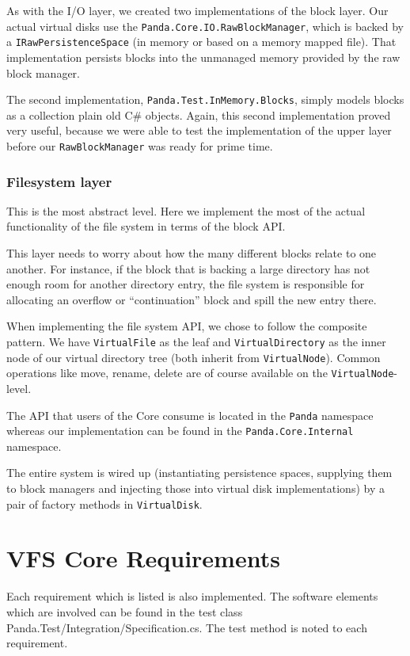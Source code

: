 \documentclass[a4paper,12pt]{article}
\begin{document}
As with the I/O layer, we created two implementations of the block layer.
Our actual virtual disks use the \texttt{Panda.Core.IO.RawBlockManager}, which is backed by a \texttt{IRawPersistenceSpace} (in memory or based on a memory mapped file).
That implementation persists blocks into the unmanaged memory provided by the raw block manager.

The second implementation, \texttt{Panda.Test.InMemory.Blocks}, simply models blocks as a collection plain old C\# objects.
Again, this second implementation proved very useful, because we were able to test the implementation of the upper layer before our \texttt{RawBlockManager} was ready for prime time.

\subsubsection{Filesystem layer}

This is the most abstract level. 
Here we implement the most of the actual functionality of the file system in terms of the block API.

This layer needs to worry about how the many different blocks relate to one another.
For instance, if the block that is backing a large directory has not enough room for another directory entry, the file system is responsible for allocating an overflow or ``continuation'' block and spill the new entry there.

When implementing the file system API, we chose to follow the composite pattern. 
We have \texttt{VirtualFile} as the leaf and \texttt{VirtualDirectory} as the inner node of our virtual directory tree (both inherit from \texttt{VirtualNode}).
Common operations like move, rename, delete are of course available on the \texttt{VirtualNode}-level.

The API that users of the Core consume is located in the \texttt{Panda} namespace whereas our implementation can be found in the \texttt{Panda.Core.Internal} namespace. 

The entire system is wired up (instantiating persistence spaces, supplying them to block managers and injecting those into virtual disk implementations) by a pair of factory methods in \texttt{VirtualDisk}.

\section{VFS Core Requirements}

Each requirement which is listed is also implemented. The software elements which are involved can be found in the test class \hbox{Panda.Test/Integration/Specification.cs}. The test method is noted to each requirement.
\end{document}
